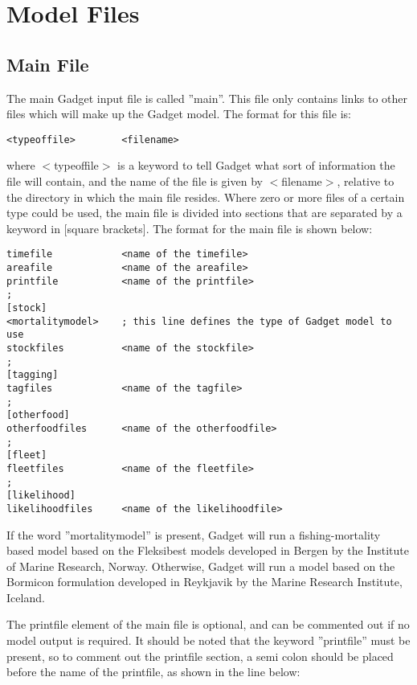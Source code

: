 \documentclass [a4paper, 10pt]{book}
\begin{document}
\chapter{Model Files}\label{chap:model}

\section{Main File}\label{sec:mainfile}
The main Gadget input file is called ''main''.  This file only contains links to other files which will make up the Gadget model.  The format for this file is:

\begin{verbatim}
<typeoffile>        <filename>
\end{verbatim}

where $<$typeoffile$>$ is a keyword to tell Gadget what sort of information the file will contain, and the name of the file is given by $<$filename$>$, relative to the directory in which the main file resides.  Where zero or more files of a certain type could be used, the main file is divided into sections that are separated by a keyword in [square brackets].  The format for the main file is shown below:

\begin{verbatim}
timefile            <name of the timefile>
areafile            <name of the areafile>
printfile           <name of the printfile>
;
[stock]
<mortalitymodel>    ; this line defines the type of Gadget model to use
stockfiles          <name of the stockfile>
;
[tagging]
tagfiles            <name of the tagfile>
;
[otherfood]
otherfoodfiles      <name of the otherfoodfile>
;
[fleet]
fleetfiles          <name of the fleetfile>
;
[likelihood]
likelihoodfiles     <name of the likelihoodfile>
\end{verbatim}

If the word ''mortalitymodel'' is present, Gadget will run a fishing-mortality based model based on the Fleksibest models developed in Bergen by the Institute of Marine Research, Norway.  Otherwise, Gadget will run a model based on the Bormicon formulation developed in Reykjavik by the Marine Research Institute, Iceland.

\bigskip
The printfile element of the main file is optional, and can be commented out if no model output is required.  It should be noted that the keyword ''printfile'' must be present, so to comment out the printfile section, a semi colon should be placed before the name of the printfile, as shown in the line below:
\end{document}
